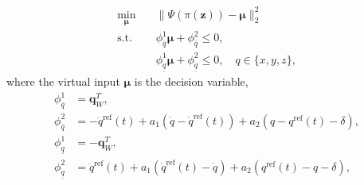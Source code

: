 \documentclass[journal,10pt]{IEEEtran}
\newcommand{\vect}[1]{\boldsymbol{\mathbf{#1}}}
\begin{document}
\begin{align} \label{CBF_QP}
\tag{CBF-QP}
    \min_{\vect{\mu}} \quad & \|\Psi(\pi(\vect{z})) - \vect{\mu}\|_2^2\\
    \text{s.t.} \quad &  \phi_{\overline{q}}^1\vect{\mu}+\phi_{\overline{q}}^2\leq 0,\nonumber\\ 
     &\phi_{\underline{q}}^1\vect{\mu}+\phi_{\underline{q}}^2\leq 0,\quad q\in\{x,y,z\},\nonumber
\end{align}
where the virtual input $\vect{\mu}$ is the decision variable, 
\begin{subequations}
\begin{align}
    \phi_{\overline{q}}^1&=\vect{q}_W^T,\label{phiup1}\\
    \phi_{\overline{q}}^2&=-\ddot{q}^{\text{ref}}(t) + a_1(\dot{q}-\dot{q}^{\text{ref}}(t))+a_2(q-q^{\text{ref}}(t)-\delta),\label{phiup2}\\
    \phi_{\underline{q}}^1&=-\vect{q}^T_W,\label{philow1}\\
    \phi_{\underline{q}}^2&=\ddot{q}^{\text{ref}}(t) + a_1(\dot{q}^{\text{ref}}(t)-\dot{q})+a_2(q^{\text{ref}}(t)-q-\delta),\label{philow2}
\end{align}
\end{subequations}
\end{document}
